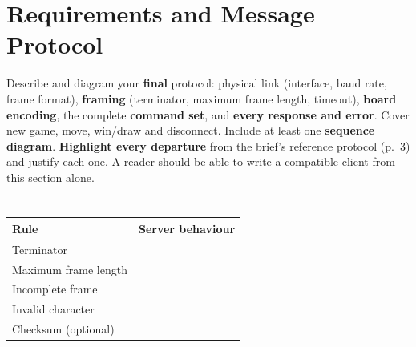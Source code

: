 \section{Requirements and Message Protocol}
\label{sec:protocol}

\begin{guidance}
Describe and diagram your \textbf{final} protocol: physical link (interface,
baud rate, frame format), \textbf{framing} (terminator, maximum frame length,
timeout), \textbf{board encoding}, the complete \textbf{command set}, and
\textbf{every response and error}. Cover new game, move, win/draw and
disconnect. Include at least one \textbf{sequence diagram}. \textbf{Highlight
every departure} from the brief's reference protocol (p.~3) and justify each
one. A reader should be able to write a compatible client from this section
alone.
\end{guidance}

\subsection{}

\begin{table}[t]
\centering
\caption{}
\label{tab:framing}
\footnotesize
\begin{tabular}{@{}L{3.0cm}L{5.0cm}@{}}
\toprule
Rule & Server behaviour \\
\midrule
Terminator &  \\
Maximum frame length &  \\
Incomplete frame &  \\
Invalid character & \ph{\ldots} \\
Checksum (optional) &  \\
\bottomrule
\end{tabular}
\end{table}

